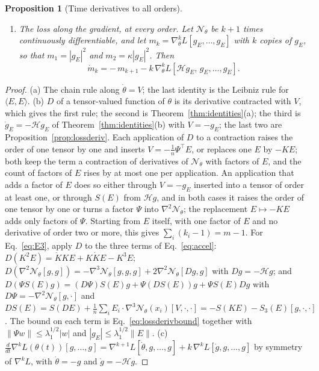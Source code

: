 \documentclass[11pt]{article}
\newtheorem{proposition}{Proposition}
\theoremstyle{definition}
\theoremstyle{remark}
\newcommand{\Net}{\mathcal{N}_\theta}    %
\newcommand{\ip}[2]{\langle #1,#2\rangle}
\newcommand{\Hess}{\mathcal{H}}          %
\begin{document}
\begin{proposition}[Time derivatives to all orders]
\begin{enumerate}[label=(\alph*)]
\begin{equation}
\end{equation}
where $S_3(E)[g,\cdot,\cdot]$ is the matrix $\frac1n\sum_iE_i\cdot\nabla^3_\theta\Net(x_i)[g,\cdot,\cdot]$.
\item \emph{The loss along the gradient, at every order.} Let $\Net$ be $k + 1$ times continuously differentiable, and let $m_k =\nabla^k_\theta L[g_E,\dots,g_E]$ with $k$ copies of $g_E$, so that $m_1 = |g_E|^2$ and $m_2 = \kappa|g_E|^2$. Then
\begin{equation}\label{eq:moments}
\dot m_k = -\,m_{k+1} - k\,\nabla^k_\theta L[\Hess g_E,\,g_E,\dots,g_E] .
\end{equation}
\end{enumerate}
\end{proposition}

\begin{proof}
(a) The chain rule along $\dot\theta = V$; the last identity is the Leibniz rule for $\ip{E}{E}$.
(b) $D$ of a tensor-valued function of $\theta$ is its derivative contracted with $V$, which gives the first rule; the second is Theorem~\ref{thm:identities}(a); the third is $\dot g_E = -\Hess g_E$ of Theorem~\ref{thm:identities}(b) with $V = -g_E$; the last two are Proposition~\ref{prop:lossderiv}.
Each application of $D$ to a contraction raises the order of one tensor by one and inserts $V = -\frac1n\Psi^\top E$, or replaces one $E$ by $-KE$; both keep the term a contraction of derivatives of $\Net$ with factors of $E$, and the count of factors of $E$ rises by at most one per application.
An application that adds a factor of $E$ does so either through $V = -g_E$ inserted into a tensor of order at least one, or through $S(E)$ from $\Hess g$, and in both cases it raises the order of one tensor by one or turns a factor $\Psi$ into $\nabla^2\Net$; the replacement $E\mapsto-KE$ adds only factors of $\Psi$.
Starting from $E$ itself, with one factor of $E$ and no derivative of order two or more, this gives $\sum_i(k_i - 1) = m - 1$.
For Eq.~\eqref{eq:E3}, apply $D$ to the three terms of Eq.~\eqref{eq:accel}: $D(K^2E) = \dot KKE + K\dot KE - K^3E$; $D(\nabla^2\Net[g,g]) = -\nabla^3\Net[g,g,g] + 2\nabla^2\Net[Dg,g]$ with $Dg = -\Hess g$; and $D(\Psi S(E)g) = (D\Psi)S(E)g + \Psi(DS(E))g + \Psi S(E)Dg$ with $D\Psi = -\nabla^2\Net[g,\cdot]$ and $DS(E) = S(DE) + \frac1n\sum_iE_i\cdot\nabla^3\Net(x_i)[V,\cdot,\cdot] = -S(KE) - S_3(E)[g,\cdot,\cdot]$.
The bound on each term is Eq.~\eqref{eq:lossderivbound} together with $\|\Psi w\|\le\lambda_1^{1/2}|w|$ and $|g_E|\le\lambda_1^{1/2}\|E\|$.
(c) $\frac{d}{dt}\nabla^kL(\theta(t))[g,\dots,g] = \nabla^{k+1}L[\dot\theta,g,\dots,g] + k\,\nabla^kL[\dot g,g,\dots,g]$ by symmetry of $\nabla^kL$, with $\dot\theta = -g$ and $\dot g = -\Hess g$.
\end{proof}
\end{document}

